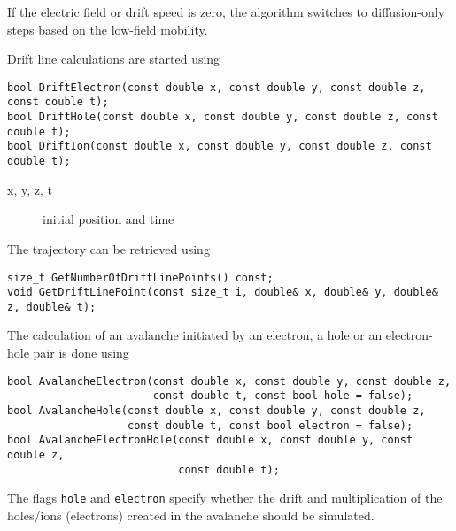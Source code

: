 If the electric field or drift speed is zero, the algorithm switches 
to diffusion-only steps based on the low-field mobility.

Drift line calculations are started using 
\begin{lstlisting}
bool DriftElectron(const double x, const double y, const double z, const double t);
bool DriftHole(const double x, const double y, const double z, const double t);
bool DriftIon(const double x, const double y, const double z, const double t);
\end{lstlisting}
\begin{description}
  \item[x, y, z, t] initial position and time
\end{description}
The trajectory can be retrieved using
\begin{lstlisting} 
size_t GetNumberOfDriftLinePoints() const;
void GetDriftLinePoint(const size_t i, double& x, double& y, double& z, double& t);
\end{lstlisting}

The calculation of an avalanche initiated by an electron, 
a hole or an electron-hole pair is done using
\begin{lstlisting}
bool AvalancheElectron(const double x, const double y, const double z,
                       const double t, const bool hole = false);
bool AvalancheHole(const double x, const double y, const double z,
                   const double t, const bool electron = false);
bool AvalancheElectronHole(const double x, const double y, const double z, 
                           const double t);
\end{lstlisting}
The flags \texttt{hole} and \texttt{electron} specify whether the  
drift and multiplication of the holes/ions (electrons) created in the 
avalanche should be simulated. 


